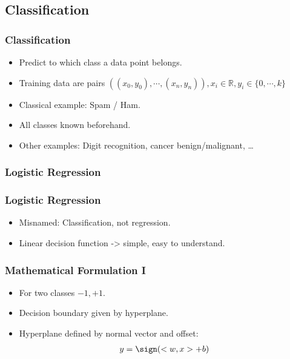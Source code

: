 \subsection{Classification}
\begin{frame}
    \frametitle{Classification}
    \begin{itemize}
        \item Predict to which class a data point belongs.
        \item Training data are pairs $\left( (x_0, y_0), \cdots, (x_n, y_n)
                \right), x_i \in \mathbb{R}, y_i \in \{0, \cdots, k\}$
        \item Classical example: Spam / Ham.
        \item All classes known beforehand.
        \item Other examples: Digit recognition, cancer benign/malignant, \ldots
    \end{itemize}
\end{frame}

\subsubsection{Logistic Regression}
\begin{frame}
    \frametitle{Logistic Regression}
    \begin{itemize}
        \item Misnamed: Classification, not regression.
        \item Linear decision function -> simple, easy to understand.
    \end{itemize}
\end{frame}

\begin{frame}
    \frametitle{Mathematical Formulation I}
    \begin{itemize}
        \item For two classes $-1, +1$.
        \item Decision boundary given by hyperplane.
        \item Hyperplane defined by normal vector and offset:
            \begin{align}
            y = \sign(<w, x> + b)
            \end{align}
    \end{itemize}
\end{frame}

